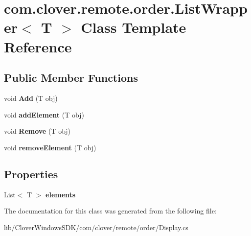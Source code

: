 \hypertarget{classcom_1_1clover_1_1remote_1_1order_1_1_list_wrapper}{}\section{com.\+clover.\+remote.\+order.\+List\+Wrapper$<$ T $>$ Class Template Reference}
\label{classcom_1_1clover_1_1remote_1_1order_1_1_list_wrapper}
\subsection*{Public Member Functions}
\begin{DoxyCompactItemize}
\item 
\mbox{\label{classcom_1_1clover_1_1remote_1_1order_1_1_list_wrapper_ad7beebf272746d39d91cbdff4027a24c}} 
void {\bfseries Add} (T obj)
\item 
\mbox{\label{classcom_1_1clover_1_1remote_1_1order_1_1_list_wrapper_aa4672fe9e771699ac985603a135dba56}} 
void {\bfseries add\+Element} (T obj)
\item 
\mbox{\label{classcom_1_1clover_1_1remote_1_1order_1_1_list_wrapper_a9517ce44cfaa8f18ec27f145567e5b41}} 
void {\bfseries Remove} (T obj)
\item 
\mbox{\label{classcom_1_1clover_1_1remote_1_1order_1_1_list_wrapper_a344b12648795d52a45e0cb9f5bd134b0}} 
void {\bfseries remove\+Element} (T obj)
\end{DoxyCompactItemize}
\subsection*{Properties}
\begin{DoxyCompactItemize}
\item 
\mbox{\label{classcom_1_1clover_1_1remote_1_1order_1_1_list_wrapper_a9f77364faa9e5e397c1788e61e15e0cd}} 
List$<$ T $>$ {\bfseries elements}
\end{DoxyCompactItemize}


The documentation for this class was generated from the following file\+:\begin{DoxyCompactItemize}
\item 
lib/\+Clover\+Windows\+S\+D\+K/com/clover/remote/order/Display.\+cs\end{DoxyCompactItemize}
